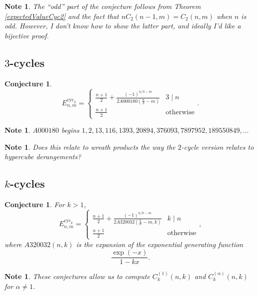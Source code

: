 \documentclass{article}
\newtheorem{conjecture}[theo]{Conjecture}
\newtheorem{note}[theo]{Note}
\begin{document}
  \begin{note}
    The ``odd'' part of the conjecture follows from Theorem
    \ref{expectedValueCyc2} and the fact that $nC_2(n-1,m) = C_2(n,m)$ when $n$ is odd.
    However, I don't know how to show the latter part, and ideally I'd like a bijective proof.
  \end{note}
  \subsection{$3$-cycles}
  \begin{conjecture}
    \begin{equation}
      E_{n,m}^{\text{cyc}_3} = \begin{cases}
        \displaystyle\frac{n+1}{2} + \frac{(-1)^{n/3-m}}{2 A000180(\frac n3 - m)} & 3 \mid n \\
        \displaystyle\frac{n+1}{2} & \text{otherwise}
      \end{cases}.
    \end{equation}
  \end{conjecture}
  \begin{note}
    $A000180$ begins $1, 2, 13, 116, 1393, 20894, 376093, 7897952, 189550849, \dots$
  \end{note}
  \begin{note}
    Does this relate to wreath products the way the $2$-cycle version relates 
    to hypercube derangements?
  \end{note}
  \subsection{$k$-cycles}
  \begin{conjecture}
    For $k > 1$,
    \begin{equation}
      E_{n,m}^{\text{cyc}_k} = \begin{cases}
        \displaystyle\frac{n+1}{2} + \frac{(-1)^{n/k-m}}{2 A320032(\frac nk - m, k)} & k \mid n \\
        \displaystyle\frac{n+1}{2} & \text{otherwise}
      \end{cases},
    \end{equation} where $A320032(n,k)$ is the expansion of the exponential 
    generating function \begin{equation}
      \frac{\exp(-x)}{1 - kx}.
    \end{equation}
  \end{conjecture}
  \begin{note}
    These conjectures allow us to compute $C_k^{(1)}(n,k)$ and $C_k^{(\alpha)}(n,k)$ for $\alpha \neq 1$.
  \end{note}
\end{document}
